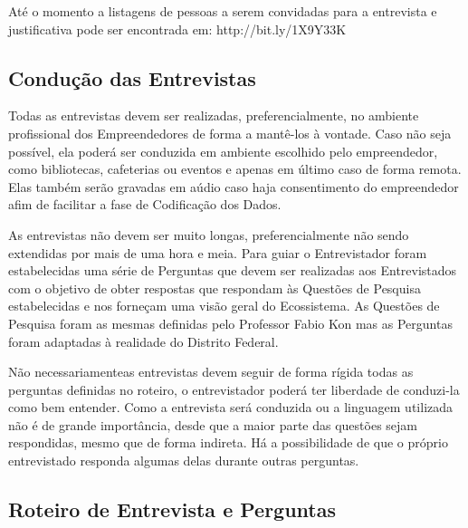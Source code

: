 Até o momento a listagens de pessoas a serem convidadas para a entrevista e justificativa pode ser encontrada em: http://bit.ly/1X9Y33K

\subsection{Condução das Entrevistas}
\label{subsection:conducao_das_entrevistas}

Todas as entrevistas devem ser realizadas, preferencialmente, no ambiente profissional dos Empreendedores de forma a mantê-los à vontade. Caso não seja possível, ela poderá ser conduzida em ambiente escolhido pelo empreendedor, como bibliotecas, cafeterias ou eventos e apenas em último caso de forma remota. Elas também serão gravadas em aúdio caso haja consentimento do empreendedor afim de facilitar a fase de Codificação dos Dados.

As entrevistas não devem ser muito longas, preferencialmente não sendo extendidas por mais de uma hora e meia. Para guiar o Entrevistador foram estabelecidas uma série de Perguntas que devem ser realizadas aos Entrevistados com o objetivo de obter respostas que respondam às Questões de Pesquisa estabelecidas e nos forneçam uma visão geral do Ecossistema. As Questões de Pesquisa foram as mesmas definidas pelo Professor Fabio Kon mas as Perguntas foram adaptadas à realidade do Distrito Federal.

Não necessariamenteas entrevistas devem seguir de forma rígida todas as perguntas definidas no roteiro, o entrevistador poderá ter liberdade de conduzi-la como bem entender. Como a entrevista será conduzida ou a linguagem utilizada não é de grande importância, desde que a maior parte das questões sejam respondidas, mesmo que de forma indireta. Há a possibilidade de que o próprio entrevistado responda algumas delas durante outras perguntas. 

\subsection{Roteiro de Entrevista e Perguntas}
\label{subsection:roteiro_de_entrevista_e_perguntas}

